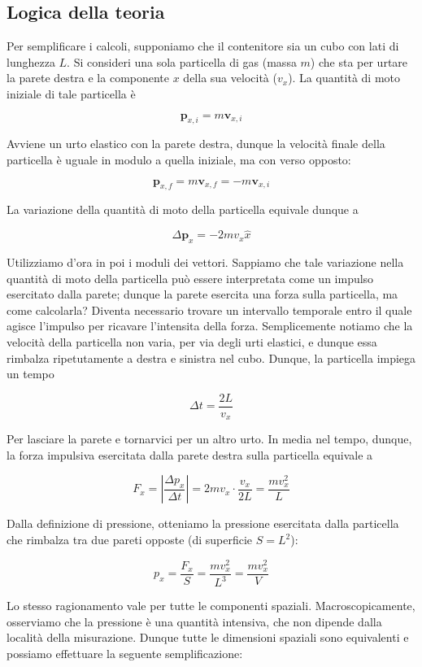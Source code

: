 \subsection*{Logica della teoria}
Per semplificare i calcoli, supponiamo che il contenitore sia un
cubo con lati di lunghezza $L$. Si consideri una sola particella
di gas (massa $m$) che sta per urtare la parete destra e la componente $x$
della sua velocità ($v_x$). La quantità di moto iniziale di tale particella
è

\[ \mathbf{p}_{x,i} = m\textbf{v}_{x,i} \]

Avviene un urto elastico con la parete destra, dunque la velocità finale
della particella è uguale in modulo a quella iniziale, ma con verso
opposto:

\[ \mathbf{p}_{x,f} = m\textbf{v}_{x,f} = -m\textbf{v}_{x,i} \]

La variazione della quantità di moto della particella equivale dunque
a

\[ \Delta\mathbf{p}_x = -2mv_x\hat{x} \]

Utilizziamo d'ora in poi i moduli dei vettori. Sappiamo che tale
variazione nella quantità di moto della particella può essere
interpretata come un impulso esercitato dalla parete; dunque la
parete esercita una forza sulla particella, ma come calcolarla?
Diventa necessario trovare un intervallo temporale entro il quale
agisce l'impulso per ricavare l'intensita della forza.
Semplicemente notiamo che la velocità della particella non varia,
per via degli urti elastici, e dunque essa rimbalza ripetutamente
a destra e sinistra nel cubo. Dunque, la particella impiega un tempo

\[ \Delta t = \frac{2L}{v_x} \]

Per lasciare la parete e tornarvici per un altro urto. In media nel
tempo, dunque, la forza impulsiva esercitata dalla parete destra
sulla particella equivale a

\[ F_x = \left|\frac{\Delta p_x}{\Delta t}\right| = 2mv_x \cdot \frac{v_x}{2L} = \frac{mv_x^2}{L} \]

Dalla definizione di pressione, otteniamo la pressione esercitata
dalla particella che rimbalza tra due pareti opposte (di superficie
$S = L^2$):

\[ p_x = \frac{F_x}{S} = \frac{mv_x^2}{L^3} = \frac{mv_x^2}{V} \]

Lo stesso ragionamento vale per tutte le componenti spaziali.
Macroscopicamente, osserviamo che la pressione è una quantità intensiva,
che non dipende dalla località della misurazione. Dunque tutte
le dimensioni spaziali sono equivalenti e possiamo effettuare la
seguente semplificazione:

